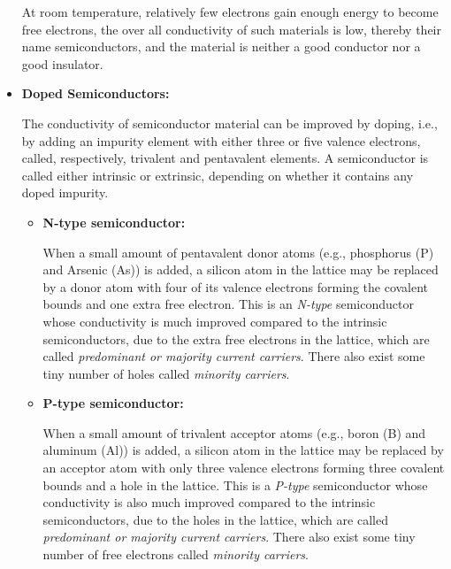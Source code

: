 \documentclass{article}
\begin{document}
\begin{itemize}
At room temperature, relatively few electrons gain enough energy to become
free electrons, the over all conductivity of such materials is low, thereby
their name semiconductors, and the material is neither a good conductor nor
a good insulator.


\item {\bf Doped Semiconductors:}

The conductivity of semiconductor material can be improved by doping, i.e.,
by adding an impurity element with either three or five valence electrons,
called, respectively, trivalent and pentavalent elements. A semiconductor
is called either intrinsic or extrinsic, depending on whether it contains
any doped impurity.



\begin{itemize}
\item {\bf N-type semiconductor:}

When a small amount of pentavalent donor atoms (e.g., phosphorus (P) and
Arsenic (As)) is added, a silicon atom in the lattice may be replaced by
a donor atom with four of its valence electrons forming the covalent bounds 
and one extra free electron. This is an {\em N-type} semiconductor whose 
conductivity is much improved compared to the intrinsic semiconductors, due 
to the extra free electrons in the lattice, which are called {\em predominant
or majority current carriers}. There also exist some tiny number of holes 
called {\em minority carriers}.

\item {\bf P-type semiconductor:}

When a small amount of trivalent acceptor atoms (e.g., boron (B) and aluminum
(Al)) is added, a silicon atom in the lattice may be replaced by an acceptor
atom with only three valence electrons forming three covalent bounds and a 
hole in the lattice. This is a {\em P-type} semiconductor whose conductivity 
is also much improved compared to the intrinsic semiconductors, due to the 
holes in the lattice, which are called {\em predominant or majority current 
carriers}. There also exist some tiny number of free electrons called 
{\em minority carriers}.
\end{itemize}



\end{itemize}
\end{document}
